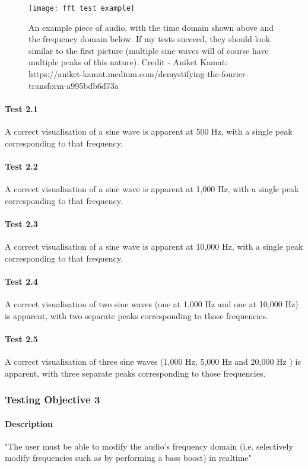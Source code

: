 \begin{figure}[H]
	\texttt{[image: fft test example]}
	\caption{An example piece of audio, with the time domain shown above and the frequency domain below. If my tests succeed, they should look similar to the first picture (multiple sine waves will of course have multiple peaks of this nature). Credit - Aniket Kamat: https://aniket-kamat.medium.com/demystifying-the-fourier-transform-a995bdb6d73a}
\end{figure}

\paragraph{Test 2.1} A correct visualisation of a sine wave is apparent at 500 Hz, with a single peak corresponding to that frequency.
\paragraph{Test 2.2} A correct visualisation of a sine wave is apparent at 1,000 Hz, with a single peak corresponding to that frequency.
\paragraph{Test 2.3} A correct visualisation of a sine wave is apparent at 10,000 Hz, with a single peak corresponding to that frequency.
\paragraph{Test 2.4} A correct visualisation of two sine waves (one at 1,000 Hz and one at 10,000 Hz) is apparent, with two separate peaks corresponding to those frequencies.
\paragraph{Test 2.5} A correct visualisation of three sine waves (1,000 Hz, 5,000 Hz and 20,000 Hz ) is apparent, with three separate peaks corresponding to those frequencies.

\subsubsection{Testing Objective 3}
\paragraph{Description} "The user must be able to modify the audio's frequency domain (i.e. selectively modify frequencies such as by performing a bass boost) in realtime"

